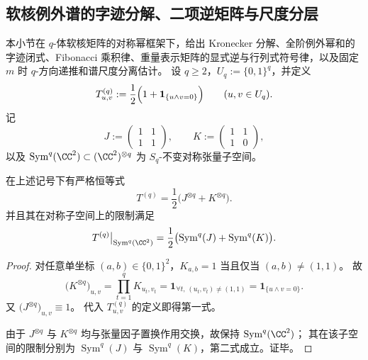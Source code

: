 \subsection{软核例外谱的字迹分解、二项逆矩阵与尺度分层}\label{subsec:conclusion-softcore-wordtrace-binomial-inverse-scale-separation}
本小节在 \(q\)-体软核矩阵的对称幂框架下，给出 Kronecker 分解、全阶例外幂和的字迹闭式、Fibonacci 乘积律、重量表示矩阵的显式逆与行列式符号律，以及固定 \(m\) 时 \(q\)-方向递推和谱尺度分离估计。
设 \(q\ge 2\)，\(U_q:=\{0,1\}^q\)，并定义
\[
T^{(q)}_{u,v}:=\frac12\Bigl(1+\mathbf 1_{\{u\wedge v=0\}}\Bigr)\qquad (u,v\in U_q).
\]
记
\[
J:=\begin{pmatrix}1&1\\[2pt]1&1\end{pmatrix},
\qquad
K:=\begin{pmatrix}1&1\\[2pt]1&0\end{pmatrix},
\]
以及 \(\operatorname{Sym}^q(\CC^2)\subset(\CC^2)^{\otimes q}\) 为 \(S_q\)-不变对称张量子空间。

\begin{theorem}\label{thm:conclusion-softcore-kronecker-sympower-decomposition}
在上述记号下有严格恒等式
\[
T^{(q)}=\frac12\bigl(J^{\otimes q}+K^{\otimes q}\bigr).
\]
并且其在对称子空间上的限制满足
\[
T^{(q)}\big|_{\operatorname{Sym}^q(\CC^2)}
=\frac12\bigl(\operatorname{Sym}^q(J)+\operatorname{Sym}^q(K)\bigr).
\]
\end{theorem}
\begin{proof}
对任意单坐标 \((a,b)\in\{0,1\}^2\)，\(K_{a,b}=1\) 当且仅当 \((a,b)\neq(1,1)\)。
故
\[
\bigl(K^{\otimes q}\bigr)_{u,v}
=\prod_{t=1}^{q}K_{u_t,v_t}
=\mathbf 1_{\forall t,\,(u_t,v_t)\neq(1,1)}
=\mathbf 1_{\{u\wedge v=0\}}.
\]
又 \(\bigl(J^{\otimes q}\bigr)_{u,v}\equiv 1\)。
代入 \(T^{(q)}_{u,v}\) 的定义即得第一式。

由于 \(J^{\otimes q}\) 与 \(K^{\otimes q}\) 均与张量因子置换作用交换，故保持 \(\operatorname{Sym}^q(\CC^2)\)；
其在该子空间的限制分别为 \(\operatorname{Sym}^q(J)\) 与 \(\operatorname{Sym}^q(K)\)，第二式成立。证毕。
\end{proof}

